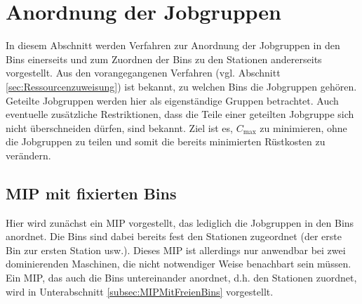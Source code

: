 \documentclass{scrreprt}
\begin{document}
\section{Anordnung der Jobgruppen}
\label{sec:AnordnungDerJobgruppen}
In diesem Abschnitt werden Verfahren zur Anordnung der Jobgruppen in den Bins einerseits und
zum Zuordnen der Bins zu den Stationen andererseits vorgestellt.
Aus den vorangegangenen Verfahren (vgl. Abschnitt \ref{sec:Ressourcenzuweisung}) ist bekannt, zu welchen Bins die Jobgruppen gehören.
Geteilte Jobgruppen werden hier als eigenständige Gruppen betrachtet.
Auch eventuelle zusätzliche Restriktionen, dass die Teile einer geteilten Jobgruppe sich nicht überschneiden dürfen, sind bekannt.
Ziel ist es, $C_{\max}$ zu minimieren, ohne die Jobgruppen zu teilen und somit die bereits minimierten Rüstkosten zu verändern.


\subsection{MIP mit fixierten Bins}
\label{subsec:MIPMitFixiertenBins}
Hier wird zunächst ein MIP vorgestellt, das lediglich die Jobgruppen in den Bins anordnet.
Die Bins sind dabei bereits fest den Stationen zugeordnet (der erste Bin zur ersten Station usw.).
Dieses MIP ist allerdings nur anwendbar bei zwei dominierenden Maschinen, die nicht notwendiger Weise benachbart sein müssen.
Ein MIP, das auch die Bins untereinander anordnet, d.h. den Stationen zuordnet, wird in Unterabschnitt \ref{subsec:MIPMitFreienBins} vorgestellt.
\end{document}
